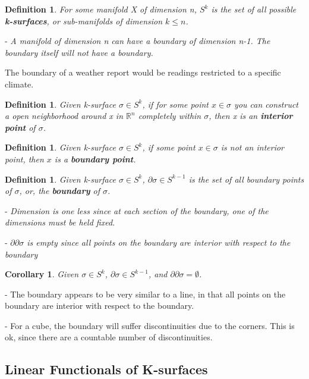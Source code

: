\documentclass{book}
\newtheorem{defn}[equation]{Definition}
\newtheorem{coro}[equation]{Corollary}
\begin{document}
\begin{defn}
	For some manifold X of dimension n, $S^k$ is the set of all possible \textbf{k-surfaces}, or sub-manifolds of dimension $k \leq n$. 
\end{defn}

- \emph{A manifold of dimension n can have a boundary of dimension n-1. The boundary itself will not have a boundary.}

The boundary of a weather report would be readings restricted to a specific climate. 


\begin{defn}
	Given k-surface $\sigma \in S^k$, if for some point $x \in \sigma$ you can construct a open neighborhood around x in $\mathbb{R}^n$ completely within $\sigma$, then x is an \textbf{interior point} of $\sigma$. 
\end{defn}

\begin{defn}
	Given k-surface $\sigma \in S^k$, if some point $x \in \sigma$ is not an interior point, then $x$ is a \textbf{boundary point}.
\end{defn}

\begin{defn}
	Given k-surface $\sigma \in S^k$, $\partial\sigma \in S^{k-1}$ is the set of all boundary points of $\sigma$, or, the \textbf{boundary} of $\sigma$. 
\end{defn}

- \emph{Dimension is one less since at each section of the boundary, one of the dimensions must be held fixed. }

- \emph{$\partial\partial\sigma$ is empty since all points on the boundary are interior with respect to the boundary}


\begin{coro}
	Given $\sigma \in S^k$, $\partial\sigma \in S^{k-1}$, and $\partial\partial\sigma = \emptyset$. 
\end{coro}


- The boundary appears to be very similar to a line, in that all points on the boundary are interior with respect to the boundary. 

- For a cube, the boundary will suffer discontinuities due to the corners. This is ok, since there are a countable number of discontinuities. 

\subsection{Linear Functionals of K-surfaces}
\end{document}
